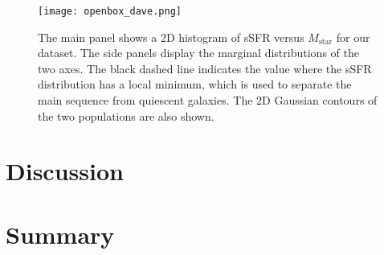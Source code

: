 \documentclass[fleqn,usenatbib]{mnras}
\begin{document}
\begin{figure}
    \begin{centering}
	\texttt{[image: openbox\_dave.png]}
    \caption{The main panel shows a 2D histogram of sSFR versus $M_{\text{star}}$ for our dataset. The side panels display the marginal distributions of the two axes. The black dashed line indicates the value where the sSFR distribution has a local minimum, which is used to separate the main sequence from quiescent galaxies. The 2D Gaussian contours of the two populations are also shown.}
    \end{centering}
    \label{fig:openbox_dave}
\end{figure}



\section{Discussion}\label{sec:discussion}




\section{Summary}\label{sec:summary}






 


\label{lastpage}
\end{document}

